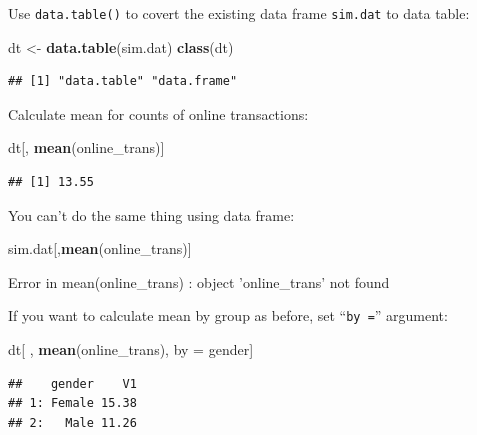 \documentclass[12pt,]{krantz}
\newenvironment{Shaded}{\begin{snugshade}}{\end{snugshade}}
\newcommand{\KeywordTok}[1]{\textcolor[rgb]{0.13,0.29,0.53}{\textbf{#1}}}
\newcommand{\StringTok}[1]{\textcolor[rgb]{0.31,0.60,0.02}{#1}}
\newcommand{\NormalTok}[1]{#1}
\theoremstyle{definition}
\theoremstyle{definition}
\theoremstyle{definition}
\theoremstyle{remark}
\begin{document}
Use \texttt{data.table()} to covert the existing data frame
\texttt{sim.dat} to data table:

\begin{Shaded}
\begin{Highlighting}[]
\NormalTok{dt <-}\StringTok{ }\KeywordTok{data.table}\NormalTok{(sim.dat)}
\KeywordTok{class}\NormalTok{(dt)}
\end{Highlighting}
\end{Shaded}

\begin{verbatim}
## [1] "data.table" "data.frame"
\end{verbatim}

Calculate mean for counts of online transactions:

\begin{Shaded}
\begin{Highlighting}[]
\NormalTok{dt[, }\KeywordTok{mean}\NormalTok{(online_trans)]}
\end{Highlighting}
\end{Shaded}

\begin{verbatim}
## [1] 13.55
\end{verbatim}

You can't do the same thing using data frame:

\begin{Shaded}
\begin{Highlighting}[]
\NormalTok{sim.dat[,}\KeywordTok{mean}\NormalTok{(online_trans)]}
\end{Highlighting}
\end{Shaded}

\begin{Shaded}
\begin{Highlighting}[]
\NormalTok{Error in mean(online_trans) : object 'online_trans' not found}
\end{Highlighting}
\end{Shaded}

If you want to calculate mean by group as before, set ``\texttt{by\ =}''
argument:

\begin{Shaded}
\begin{Highlighting}[]
\NormalTok{dt[ , }\KeywordTok{mean}\NormalTok{(online_trans), by =}\StringTok{ }\NormalTok{gender]}
\end{Highlighting}
\end{Shaded}

\begin{verbatim}
##    gender    V1
## 1: Female 15.38
## 2:   Male 11.26
\end{verbatim}
\end{document}
